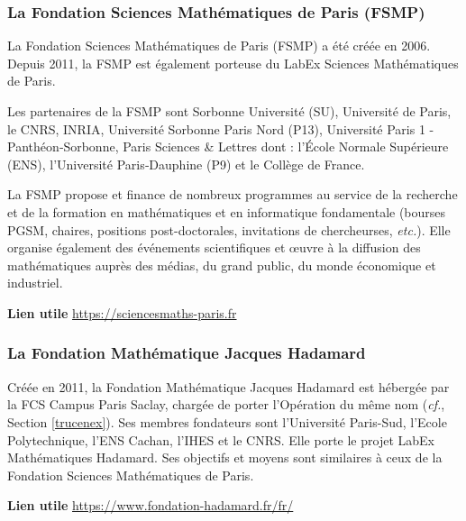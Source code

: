 \subsubsection{La Fondation Sciences Math\'ematiques de Paris (FSMP)}

La Fondation Sciences Math\'ematiques de Paris (FSMP) a \'et\'e cr\'e\'ee en 2006. Depuis 2011, la FSMP est \'egalement porteuse du LabEx Sciences Math\'ematiques de Paris. 

Les partenaires de la FSMP sont Sorbonne Universit\'e (SU), Universit\'e de Paris, le CNRS, INRIA, Universit\'e Sorbonne Paris Nord (P13), Universit\'e Paris 1 - Panth\'eon‑Sorbonne, Paris Sciences \& Lettres dont : l'\'Ecole Normale Sup\'erieure (ENS), l'Universit\'e Paris‑Dauphine (P9) et le Coll\`ege de France.

La FSMP propose et finance de nombreux programmes au service de la recherche et de la formation en math\'ematiques et en informatique fondamentale (bourses PGSM, chaires, positions post-doctorales,  invitations de chercheur\mp se\mp s, {\em etc.}). Elle organise \'egalement des \'ev\'enements scientifiques et {\oe}uvre \`a la diffusion des math\'ematiques aupr\`es des m\'edias, du grand public, du monde \'economique et industriel.

\textbf{Lien utile\hspace{.5em}}
\url{https://sciencesmaths-paris.fr}

\subsubsection{La Fondation Math\'ematique Jacques Hadamard}

Cr\'e\'ee en 2011, la Fondation Math\'ematique Jacques Hadamard est h\'eberg\'ee par la FCS Campus Paris Saclay, charg\'ee de porter l'Op\'eration du m\^eme nom ({\em cf.}, Section \ref{trucenex}).
Ses membres fondateurs sont l'Universit\'e Paris-Sud, l'Ecole Polytechnique, l'ENS Cachan, l'IHES et le CNRS. Elle porte le projet LabEx Math\'ematiques Hadamard. Ses objectifs
et moyens sont similaires \`a ceux de la Fondation Sciences Math\'ematiques de Paris.

\textbf{Lien utile\hspace{.5em}}
\url{https://www.fondation-hadamard.fr/fr/}